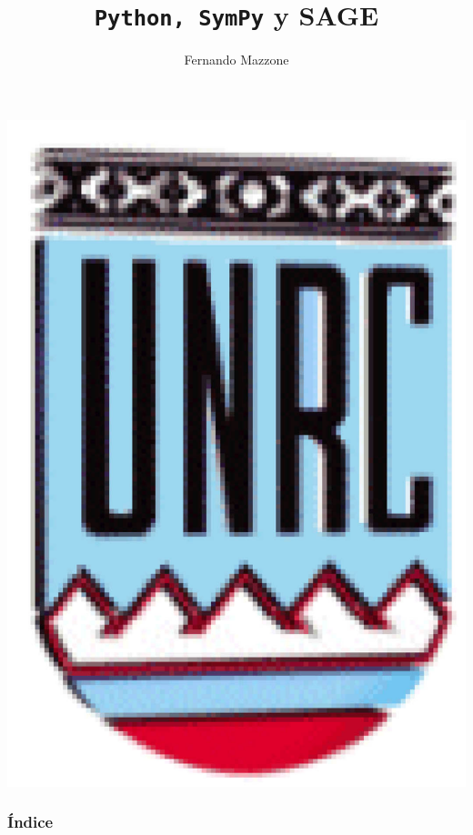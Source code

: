 \documentclass[handout,hyperref={colorlinks=true}]{beamer}
\title[python, SymPy, SAGE] %
{%
\texttt{Python, SymPy} y SAGE
}
\author[] %
{Fernando Mazzone}
\institute[Depto de Matemática] %
{
 Depto de Matemática\\
Facultad de Ciencias Exactas Físico-Químicas y Naturales\\
Universidad Nacional de Río Cuarto}
\begin{document}
\begin{frame}
  \maketitle
  \begin{center}
   \includegraphics[scale=0.2]{imagenes/unrc.jpg}
   \end{center}
\end{frame}
\begin{frame}
    \frametitle{Índice}
\tableofcontents

\end{frame}
\end{document}
